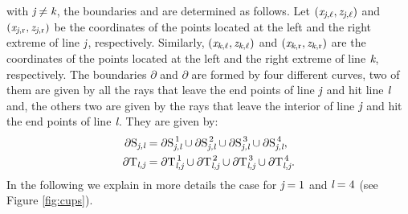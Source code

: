 with $\textit{j}\neq \textit{k}$, the boundaries  and  are determined as follows. Let $(\textit{x}_{\textit{j}, \ell}, \textit{z}_{\textit{j}, \ell})$ and $(\textit{x}_{\textit{j}, \textrm{r}},\textit{z}_{\textit{j}, \textrm{r}})$ be the coordinates of the points located at the left and the right extreme of line $\textit{j}$, respectively.
Similarly, $(\textit{x}_{\textit{k}, \ell}, \textit{z}_{\textit{k}, \ell})$ and $(\textit{x}_{\textit{k}, \textrm{r}},\textit{z}_{\textit{k}, \textrm{r}})$ are the coordinates of the points located at the left and the right extreme of line $\textit{k}$, respectively.
The boundaries $\partial$ and $\partial$ are  %
formed by four different curves,
two of them are given by all the rays that leave the end points of line $\textit{j}$ and hit line $\textit{l}$ and, the others two are given by the rays
that leave the interior of line $\textit{j}$ and hit the end points of line $\textit{l}$.
They are given by:
 \begin{equation}
\label{eq:analytic_boundaries}
 \begin{split}
 \partial\mbox{$\textup{S}_{\textit{\textit{j},\textit{l}}}$} & = \partial\mbox{$\textup{S}_{\textit{\textit{j},\textit{l}}}^{\,1}$}\cup \partial\mbox{$\textup{S}_{\textit{\textit{j},\textit{l}}}^{\,2}$} \cup \partial\mbox{$\textup{S}_{\textit{\textit{j},\textit{l}}}^{\,3}$}\cup \partial\mbox{$\textup{S}_{\textit{\textit{j},\textit{l}}}^{\,4}$},\\
\partial\mbox{$\textup{T}_{\textit{\textit{l},\textit{j}}}$} & = \partial\mbox{$\textup{T}_{\textit{\textit{l},\textit{j}}}^{\,1}$}\cup \partial\mbox{$\textup{T}_{\textit{\textit{l},\textit{j}}}^{\,2}$}\cup \partial\mbox{$\textup{T}_{\textit{\textit{l},\textit{j}}}^{\,3}$}\cup \partial\mbox{$\textup{T}_{\textit{\textit{l},\textit{j}}}^{\,4}$}.
 \end{split}
 \end{equation}
In the following we explain in more details the case for $\textit{\textit{j}}=1$ and $\textit{\textit{l}}=4$ (see Figure \ref{fig:cups}).
